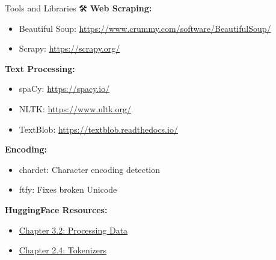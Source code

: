 \documentclass[aspectratio=169]{beamer}
\begin{document}
\begin{frame}[shrink=10]{Tools and Libraries 🛠️}
    \textbf{Web Scraping:}
    \begin{itemize}\setlength{\itemsep}{0pt}
        \item Beautiful Soup: \url{https://www.crummy.com/software/BeautifulSoup/}
        \item Scrapy: \url{https://scrapy.org/}
    \end{itemize}

    \vspace{0.3em}
    \textbf{Text Processing:}
    \begin{itemize}\setlength{\itemsep}{0pt}
        \item spaCy: \url{https://spacy.io/}
        \item NLTK: \url{https://www.nltk.org/}
        \item TextBlob: \url{https://textblob.readthedocs.io/}
    \end{itemize}

    \vspace{0.3em}
    \textbf{Encoding:}
    \begin{itemize}\setlength{\itemsep}{0pt}
        \item chardet: Character encoding detection
        \item ftfy: Fixes broken Unicode
    \end{itemize}

    \vspace{0.3em}
    \textbf{HuggingFace Resources:}
    \begin{itemize}\setlength{\itemsep}{0pt}
        \item \href{https://huggingface.co/learn/nlp-course/chapter3/2}{Chapter 3.2: Processing Data}
        \item \href{https://huggingface.co/learn/nlp-course/chapter2/4}{Chapter 2.4: Tokenizers}
    \end{itemize}
\end{frame}
\end{document}
